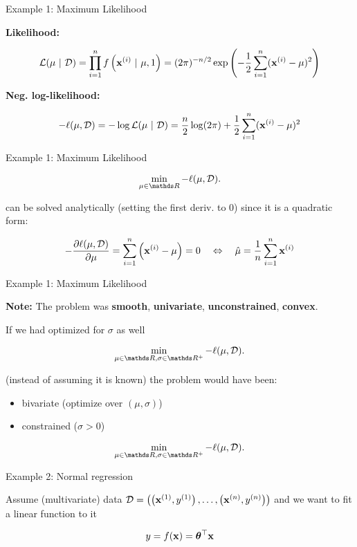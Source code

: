 \documentclass[11pt,compress,t,notes=noshow, xcolor=table]{beamer}
\begin{document}
\begin{framei}{Example 1: Maximum Likelihood}
\item \textbf{Likelihood:}
\item[] $$ \mathcal{L}(\mu~|~\mathcal{D})= \prod_{i=1}^{n} f\left(\mathbf{x}^{(i)}~|~\mu, 1\right) = (2\pi)^{-n/2}\exp\left(-\frac{1}{2} \sum_{i=1}^{n} (\mathbf{x}^{(i)}-\mu)^{2} \right) $$
\item \textbf{Neg. log-likelihood:}
\item[] $$ - \ell(\mu, \mathcal{D}) = - \log \mathcal{L}(\mu~|~\mathcal{D}) = \frac{n}{2} \log(2\pi) + \frac{1}{2} \sum_{i=1}^{n} (\mathbf{x}^{(i)}-\mu)^{2} $$
\vfill
{}
\end{framei}

\begin{framei}{Example 1: Maximum Likelihood}
\item $$ \min_{\mu \in \R} - \ell(\mu, \D). $$
\item can be solved analytically (setting the first deriv. to $0$) since it is a quadratic form:
\item[] $$ -\frac{\partial \ell(\mu, \mathcal{D})}{\partial \mu} = \sum\limits_{i=1}^n \left(\mathbf{x}^{(i)} - \mu\right) = 0 \quad \Leftrightarrow \quad \hat \mu = \frac{1}{n} \sum\limits_{i=1}^n \mathbf{x}^{(i)} $$
\vfill
{}
\end{framei}

\begin{framei}{Example 1: Maximum Likelihood}
\item \textbf{Note: } The problem was \textbf{smooth}, \textbf{univariate}, \textbf{unconstrained}, \textbf{convex}.
\item If we had optimized for $\sigma$ as well
\item[] $$ \min_{\mu \in \R, \sigma \in \R^+} - \ell(\mu, \D). $$
\item (instead of assuming it is known) the problem would have been:
\begin{itemize}
\item bivariate (optimize over $(\mu, \sigma)$)
\item constrained ($\sigma > 0$)
\end{itemize}
\item[] $$ \min_{\mu \in \R, \sigma \in \R^+} - \ell(\mu, \D). $$
\end{framei}

\begin{framei}{Example 2: Normal regression}
\item Assume (multivariate) data $\mathcal{D} = \left( \left(\mathbf{x}^{(1)}, y^{(1)}\right), \ldots, \left(\mathbf{x}^{(n)}, y^{(n)}\right)\right)$ and we want to fit a linear function to it
\item[] $$ y = f(\mathbf{x}) = \bm{\theta}^\top \mathbf{x} $$
\vfill
{}
\end{framei}
\end{document}
